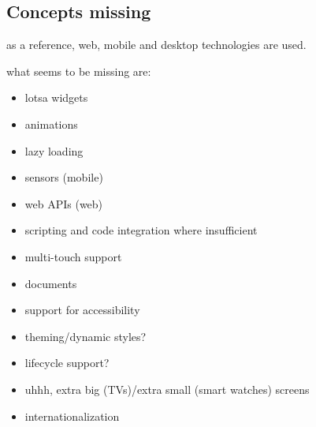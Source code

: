 \subsection{Concepts missing}\label{subsec:concepts-missing}

as a reference, web, mobile and desktop technologies are used.

what seems to be missing are:
\begin{itemize}
    \item lotsa widgets
    \item animations
    \item lazy loading
    \item sensors (mobile)
    \item web APIs (web)
    \item scripting and code integration where insufficient
    \item {} multi-touch support
    \item {} documents
    \item support for accessibility
    \item theming/dynamic styles?
    \item lifecycle support?
    \item uhhh, extra big (TVs)/extra small (smart watches) screens
    \item internationalization
\end{itemize}
